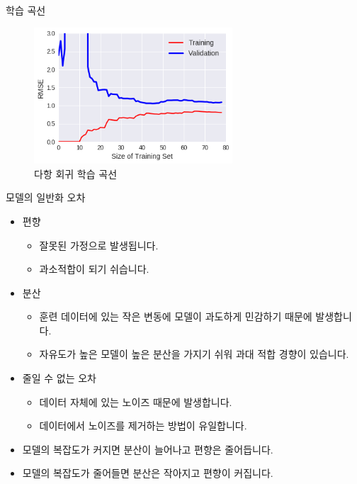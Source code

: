 \documentclass{beamer}
\numberwithin{equation}{section}
\begin{document}

\begin{frame}{학습 곡선}

\begin{figure}
\includegraphics[width=20em]{./images/learning_curve_polynomial_regression}
\caption{\label{fig:learning_curve_polynomial_regression}다항 회귀 학습 곡선}
\end{figure}

\end{frame}


\begin{frame}{모델의 일반화 오차}

\begin{itemize}
\item 편향
\begin{itemize}
    \item 잘못된 가정으로 발생됩니다.
    \item 과소적합이 되기 쉬습니다.
\end{itemize}
\item 분산
\begin{itemize}
    \item 훈련 데이터에 있는 작은 변동에 모델이 과도하게 민감하기 때문에 발생합니다.
    \item 자유도가 높은 모델이 높은 분산을 가지기 쉬워 과대 적합 경향이 있습니다.
\end{itemize}
\item 줄일 수 없는 오차
\begin{itemize}
    \item 데이터 자체에 있는 노이즈 때문에 발생합니다.
    \item 데이터에서 노이즈를 제거하는 방법이 유일합니다.
\end{itemize}
\item 모델의 복잡도가 커지면 분산이 늘어나고 편향은 줄어듭니다.
\item 모델의 복잡도가 줄어들면 분산은 작아지고 편향이 커집니다.
\end{itemize}

\end{frame}
\end{document}
